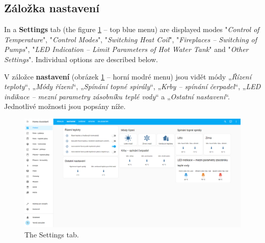 \begin{Czech}
\subsection{Záložka nastavení}
\end{Czech}

\begin{English}
In a \textbf{Settings} tab (the figure \ref{fig:settings-tab} – top blue menu) are displayed modes "\textit{Control of Temperature}", "\textit{Control Modes}", "\textit{Switching Heat Coil}", "\textit{Fireplaces – Switching of Pumps}", "\textit{LED Indication – Limit Parameters of Hot Water Tank}" and "\textit{Other Settings}". Individual options are described below.
\end{English}

\begin{Czech}
V záložce \textbf{nastavení} (obrázek \ref{fig:settings-tab} – horní modré menu) jsou vidět módy „\textit{Řízení teploty}“, „\textit{Módy řízení}“, „\textit{Spínání topné spirály}“, „\textit{Krby – spínání čerpadel}“, „\textit{LED indikace – mezní parametry zásobníku teplé vody}“ a „\textit{Ostatní nastavení}“. Jednotlivé možnosti jsou popsány níže.
\end{Czech}


\begin{English}
\begin{figure}[H]
    \centering
    \includegraphics[width=1\textwidth]{pictures/czech/software/settings-tab.png}
    \caption{The Settings tab.}
    \label{fig:settings-tab}
\end{figure}
\end{English}

